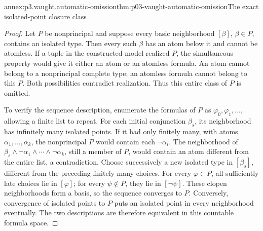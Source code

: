 \begin{annexitem}{annex:p3.vaught.automatic-omission}{thm:p03-vaught-automatic-omission}{The exact isolated-point closure class}
\begin{proof}
Let \(P\) be nonprincipal and suppose every basic neighborhood
\([\beta]\), \(\beta\in P\), contains an isolated type.
Then every such \(\beta\) has an atom below it and cannot be atomless.
If a tuple in the constructed model realized \(P\), the simultaneous
property would give it either an atom or an atomless formula.
An atom cannot belong to a nonprincipal complete type; an atomless
formula cannot belong to this \(P\). Both possibilities contradict
realization. Thus this entire class of \(P\) is omitted.

To verify the sequence description, enumerate the formulas of \(P\)
as \(\varphi_0,\varphi_1,\ldots\), allowing a finite list to repeat.
For each initial conjunction \(\beta_s\), its neighborhood has
infinitely many isolated points. If it had only finitely many,
with atoms \(\alpha_1,\ldots,\alpha_k\), the nonprincipal \(P\)
would contain each \(\neg\alpha_i\).
The neighborhood of
\(\beta_s\land\neg\alpha_1\land\cdots\land\neg\alpha_k\), still a
member of \(P\), would contain an atom different from the entire
list, a contradiction. Choose successively a new isolated type
in \([\beta_s]\), different from the preceding finitely many choices.
For every \(\varphi\in P\), all sufficiently late choices lie in
\([\varphi]\); for every \(\psi\notin P\), they lie in
\([\neg\psi]\). These clopen neighborhoods form a basis, so the
sequence converges to \(P\).
Conversely, convergence of isolated points to \(P\) puts an
isolated point in every neighborhood eventually. The two descriptions
are therefore equivalent in this countable formula space.
\end{proof}
\end{annexitem}

